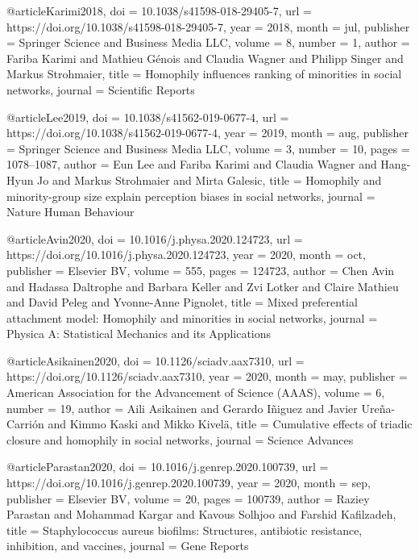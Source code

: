 @article{Karimi2018,
  doi = {10.1038/s41598-018-29405-7},
  url = {https://doi.org/10.1038/s41598-018-29405-7},
  year = {2018},
  month = jul,
  publisher = {Springer Science and Business Media {LLC}},
  volume = {8},
  number = {1},
  author = {Fariba Karimi and Mathieu G{\'{e}}nois and Claudia Wagner and Philipp Singer and Markus Strohmaier},
  title = {Homophily influences ranking of minorities in social networks},
  journal = {Scientific Reports}
}

@article{Lee2019,
  doi = {10.1038/s41562-019-0677-4},
  url = {https://doi.org/10.1038/s41562-019-0677-4},
  year = {2019},
  month = aug,
  publisher = {Springer Science and Business Media {LLC}},
  volume = {3},
  number = {10},
  pages = {1078--1087},
  author = {Eun Lee and Fariba Karimi and Claudia Wagner and Hang-Hyun Jo and Markus Strohmaier and Mirta Galesic},
  title = {Homophily and minority-group size explain perception biases in social networks},
  journal = {Nature Human Behaviour}
}

@article{Avin2020,
  doi = {10.1016/j.physa.2020.124723},
  url = {https://doi.org/10.1016/j.physa.2020.124723},
  year = {2020},
  month = oct,
  publisher = {Elsevier {BV}},
  volume = {555},
  pages = {124723},
  author = {Chen Avin and Hadassa Daltrophe and Barbara Keller and Zvi Lotker and Claire Mathieu and David Peleg and Yvonne-Anne Pignolet},
  title = {Mixed preferential attachment model: Homophily and minorities in social networks},
  journal = {Physica A: Statistical Mechanics and its Applications}
}

@article{Asikainen2020,
  doi = {10.1126/sciadv.aax7310},
  url = {https://doi.org/10.1126/sciadv.aax7310},
  year = {2020},
  month = may,
  publisher = {American Association for the Advancement of Science ({AAAS})},
  volume = {6},
  number = {19},
  author = {Aili Asikainen and Gerardo I{\~{n}}iguez and Javier Ure{\~{n}}a-Carri{\'{o}}n and Kimmo Kaski and Mikko Kivel\"{a}},
  title = {Cumulative effects of triadic closure and homophily in social networks},
  journal = {Science Advances}
}


@article{Parastan2020,
  doi = {10.1016/j.genrep.2020.100739},
  url = {https://doi.org/10.1016/j.genrep.2020.100739},
  year = {2020},
  month = sep,
  publisher = {Elsevier {BV}},
  volume = {20},
  pages = {100739},
  author = {Raziey Parastan and Mohammad Kargar and Kavous Solhjoo and Farshid Kafilzadeh},
  title = {Staphylococcus aureus biofilms: Structures,  antibiotic resistance,  inhibition,  and vaccines},
  journal = {Gene Reports}
}

